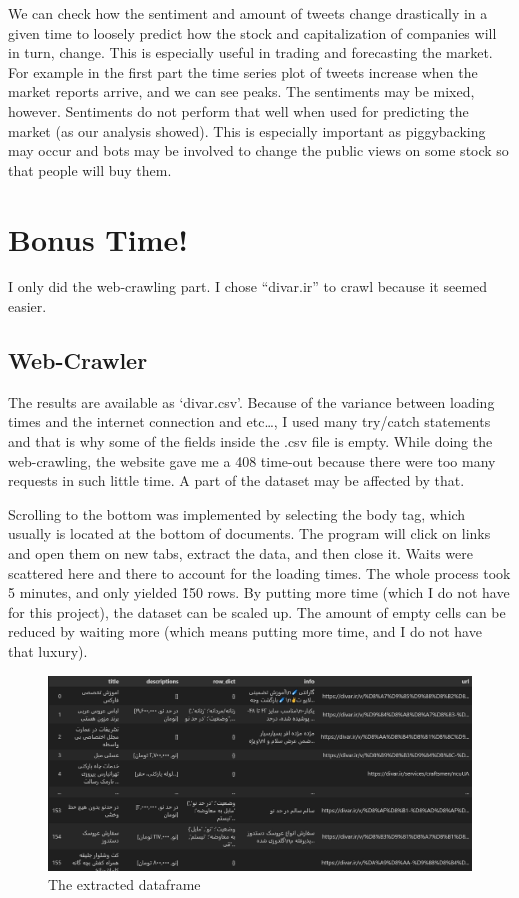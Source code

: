\documentclass[12pt]{article}
\begin{document}
We can check how the sentiment and amount of tweets change drastically in 
a given time to loosely predict how the stock and capitalization of 
companies will in turn, change. This is especially useful in trading and 
forecasting the market. For example in the first part the time series plot 
of tweets increase when the market reports arrive, and we can see peaks. 
The sentiments may be mixed, however. Sentiments do not perform that well 
when used for predicting the market (as our analysis showed). 
This is especially important as piggybacking may occur and bots may be 
involved to change the public views on some stock so that people will buy 
them.

\pagebreak

\section{Bonus Time!}
I only did the web-crawling part. I chose ``divar.ir'' to crawl because it seemed easier.

\subsection{Web-Crawler}

The results are available as `divar.csv'. Because of the variance between loading
times and the internet connection and etc\dots , I used many try/catch
statements and that is why some of the fields inside the .csv file is empty.
While doing the web-crawling, the website gave me a 408 time-out because there were
too many requests in such little time. A part of the dataset may be affected by that.

Scrolling to the bottom was implemented by selecting the body tag, which usually is located at the bottom of documents.
The program will click on links and open them on new tabs, extract the data, and then close it. Waits were 
scattered here and there to account for the loading times. The whole process took 5 minutes, and only yielded \~150 rows.
By putting more time (which I do not have for this project), the dataset can be scaled up. The amount of empty cells 
can be reduced by waiting more (which means putting more time, and I do not have that luxury).

\begin{figure}[h!]
    \centering
    \includegraphics[width=1\textwidth]{Bonus.jpg}
    \caption{The extracted dataframe}
    \label{fig:bonus}
\end{figure}

\makeendpage
\end{document}
